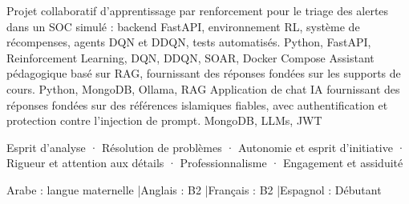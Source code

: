 {  
    {
        {Projet collaboratif d’apprentissage par renforcement pour le triage des alertes dans un SOC simulé : backend FastAPI, environnement RL, système de récompenses, agents DQN et DDQN, tests automatisés.}}
    {Python, FastAPI, Reinforcement Learning, DQN, DDQN, SOAR, Docker Compose}
    {
        {Assistant pédagogique basé sur RAG, fournissant des réponses fondées sur les supports de cours.}}
    {Python, MongoDB, Ollama, RAG}
    {
        {Application de chat IA fournissant des réponses fondées sur des références islamiques fiables, avec authentification et protection contre l’injection de prompt.}}
    {MongoDB, LLMs, JWT}

     {Esprit d’analyse · Résolution de problèmes · Autonomie et esprit d’initiative · Rigueur et attention aux détails · Professionnalisme · Engagement et assiduité}\par

     {Arabe : langue maternelle \quad|\quad Anglais : B2 \quad|\quad Français : B2 \quad|\quad Espagnol : Débutant}
  \endgroup
}
